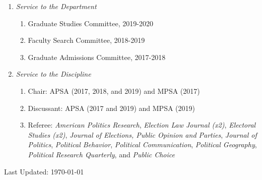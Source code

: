\documentclass[12pt]{article}
\def\footerlink{}
\begin{document}
\begin{enumerate}[topsep = 0pt, itemsep = -1ex, partopsep  = 1ex, parsep = 1ex]
	
	\item[] \textit{Service to the Department}
	
	\begin{enumerate}[topsep = 0pt, itemsep = -1ex, partopsep = -1ex, parsep = 1ex]
		
		\item[] Graduate Studies Committee, 2019-2020
		\item[] Faculty Search Committee, 2018-2019 
		\item[] Graduate Admissions Committee, 2017-2018 \\
		
	\end{enumerate}

	\item[] \textit{Service to the Discipline}

	\begin{enumerate}[topsep = 0pt, itemsep = -1ex, partopsep  = -1ex, parsep = 1ex]
	
	\item[] Chair: APSA (2017, 2018, and 2019) and MPSA (2017)
	
	\item[] Discussant: APSA (2017 and 2019) and MPSA (2019)
	
	\item[] Referee: \textit{American Politics Research}, \textit{Election Law Journal (x2)}, \textit{Electoral Studies (x2)}, \textit{Journal of Elections, Public Opinion and Parties}, \textit{Journal of Politics}, \textit{Political Behavior}, \textit{Political Communication}, \textit{Political Geography}, \textit{Political Research Quarterly}, and \textit{Public Choice} \\
	
	\end{enumerate}

\end{enumerate}

\bigskip

\begin{center}
  \begin{footnotesize}
    Last Updated: \today \\
    \href{\footerlink}{\texttt{\footerlink}}
  \end{footnotesize}
\end{center}
\end{document}
